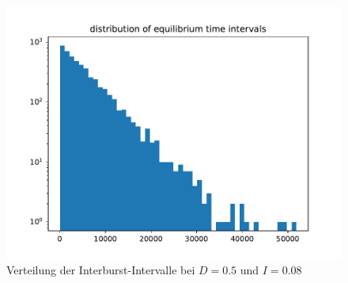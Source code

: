 \documentclass[12pt,a4paper]{article}
\begin{document}
\begin{figure}[H]
	\centering
	\includegraphics[scale=0.5]{eqdistajrj2newrealfast11jjem2st509.pdf}\caption{Verteilung der Interburst-Intervalle bei $D=0.5$ und $I=0.08$}
	\label{hist50}
\end{figure}
\end{document}
